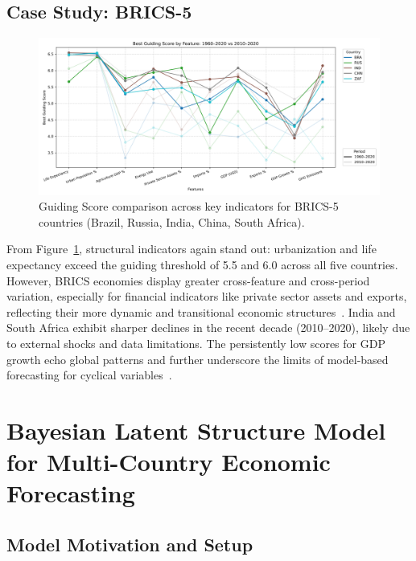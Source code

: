 \documentclass[12pt]{article}
\begin{document}
\subsection{Case Study: BRICS-5}
\begin{figure}[h]
    \centering
    \includegraphics[width=\textwidth]{comparison_feature_BRICS.png}
\caption{Guiding Score comparison across key indicators for BRICS-5 countries (Brazil, Russia, India, China, South Africa). }    
\label{fig:CaseStudyBRICS5}
\end{figure}
From Figure~\ref{fig:CaseStudyBRICS5}, structural indicators again 
 stand out: urbanization and life expectancy exceed the guiding threshold 
 of 5.5 and 6.0 across all five countries. However, BRICS economies display greater 
 cross-feature and cross-period variation, especially for financial 
 indicators like private sector assets and exports, reflecting their more 
 dynamic and transitional economic structures~\cite{Lin2012newstructural}. 
 India and South Africa exhibit sharper declines in the recent decade (2010–2020), 
 likely due to external shocks and data limitations. 
 The persistently low scores for GDP growth echo global 
 patterns and further underscore the limits of model-based forecasting 
 for cyclical variables~\cite{ClementsHendry2002}.



\section{Bayesian Latent Structure Model for Multi-Country Economic Forecasting}

\subsection{Model Motivation and Setup}
\end{document}

